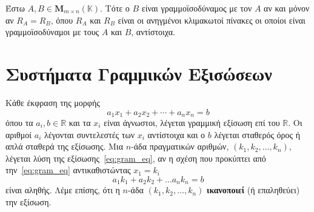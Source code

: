 \begin{prop}
  Έστω $ A, B \in \textbf{M}_{m \times n}(\mathbb{K}) $. Τότε ο $B$ είναι
  γραμμοϊσοδύναμος με τον $A$ αν και μόνον αν $ R_{A}=R_{B} $, όπου $ R_{A} $ και $ R_{B}
  $ είναι οι ανηγμένοι κλιμακωτοί πίνακες οι οποίοι είναι γραμμοϊσοδύναμοι με τους 
  $A$ και $B$, αντίστοιχα.
\end{prop}

\section*{Συστήματα Γραμμικών Εξισώσεων}

\begin{dfn}
  Κάθε έκφραση της μορφής 
  \begin{equation}\label{eq:gram_eq}
    a_{1} x_{1}+ a_{2} x_{2} + \cdots + a_{n} x_{n} = b 
  \end{equation} 
   όπου τα $ a_{i}, b \in \mathbb{R} $ και τα $ x_{i} $ είναι άγνωστοι, λέγεται 
   \textcolor{Col1}{γραμμική εξίσωση} επί του $ \mathbb{R} $. Οι αριθμοί $ a_{i} $ 
   λέγονται \textcolor{Col1}{συντελεστές} των $ x_{i} $ αντίστοιχα και ο $b$ λέγεται 
   \textcolor{Col1}{σταθερός όρος} ή απλά σταθερά της εξίσωσης. 
   Μια $n$-άδα πραγματικών αριθμών, $ (k_{1},k_{2}, \ldots,
   k_{n})$, λέγεται \textcolor{Col1}{λύση} της εξίσωσης~\eqref{eq:gram_eq}, 
   αν η σχέση που προκύπτει από την~\eqref{eq:gram_eq} αντικαθιστώντας $ x_{1} = k_{i} $
   \[
     a_{1} k_{1} + a_{2} k_{2} + \ldots a_{n}k_{n} =b 
    \] 
    είναι αληθής. Λέμε επίσης, ότι η $n$-άδα $ (k_{1},k_{2},\ldots,k_{n}) $
    \textbf{ικανοποιεί} (ή επαληθεύει) την εξίσωση.
\end{dfn}

